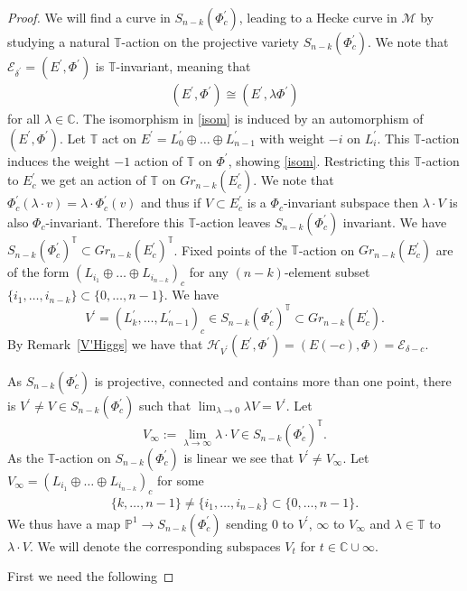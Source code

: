\documentclass[12pt]{article}
\numberwithin{equation}{section}
\theoremstyle{remark}
\theoremstyle{definition}
\numberwithin{theorem}{section}
\def\beq{\begin{eqnarray}}
\def\eeq{\end{eqnarray}}
\def\calE{{\mathcal E}}
\def\C{\mathbb{C}}
\def\M{{\mathcal{M}}}
\def\calH{\mathcal{H}}
\def\P{\mathbb{P}}
\newcommand{\T}{{\mathbb{T}}}
\def\d{{{\delta}}}
\renewcommand{\1}{\mathbbm{1}}
\begin{document}
\begin{proof}
	We will find a curve in $ S_{n-k}(\Phi^\prime_c)$, leading to a Hecke curve in $\M$ by studying a natural $\T$-action on the projective variety $S_{n-k}(\Phi^\prime_c)$. We note that $\calE_{\d^\prime}=(E^\prime, \Phi^\prime)$ is $\T$-invariant, meaning that \beq \label{isom}(E^\prime, \Phi^\prime)\cong (E^\prime, \lambda \Phi^\prime)\eeq for all $\lambda\in \C$. The isomorphism in \eqref{isom} is induced by an automorphism of $(E^\prime,\Phi^\prime)$. Let $\T$ act on $E^\prime=L^\prime_0\oplus \dots \oplus L^\prime_{n-1}$ with weight $-i$ on $L^\prime_i$. This $\T$-action induces the weight $-1$ action of $\T$ on $\Phi^\prime$, showing \eqref{isom}. Restricting this $\T$-action to $E^\prime_c$ we get an action of $\T$ on $Gr_{n-k}(E^\prime_c)$. We note that $\Phi^\prime_c(\lambda\cdot v)= \lambda\cdot \Phi^\prime_c(v)$ and thus if $V\subset E^\prime_c$ is a $\Phi_c$-invariant subspace then $\lambda\cdot V$ is also $\Phi_c$-invariant. Therefore this $\T$-action leaves $S_{n-k}(\Phi^\prime_c)$ invariant. We have $S_{n-k}(\Phi^\prime_c)^\T\subset Gr_{n-k}(E^\prime_c)^\T$.  Fixed points of the $\T$-action on $Gr_{n-k}(E^\prime_c)$ are of the form $(L_{i_1}\oplus \dots \oplus L_{i_{n-k}})_c$ for any $(n-k)$-element subset $\{i_1,\dots,i_{n-k} \}\subset \{0,\dots,n-1\}$. We  have $$V^\prime=(L^\prime_{k},\dots, L^\prime_{n-1})_c\in S_{n-k}(\Phi^\prime_c)^\T\subset Gr_{n-k}(E_c^\prime).$$ By Remark~\ref{V'Higgs} we have that $\calH_{V^\prime}(E^\prime,\Phi^\prime)=(E(-c),\Phi)=\calE_{\delta-c}$. 

 As $S_{n-k}(\Phi^\prime_c)$ is projective, connected and contains more than one point, there is $V^\prime\neq V\in S_{n-k}(\Phi^\prime_c)$ such that $\lim_{\lambda\to 0} \lambda V=V^\prime$. Let $$V_\infty:=\lim_{\lambda\to \infty} \lambda\cdot V\in S_{n-k}(\Phi^\prime_c)^\T.$$ As the $\T$-action on $S_{n-k}(\Phi^\prime_c)$ is linear we see that  $V^\prime\neq V_\infty$. Let $V_\infty=(L_{i_1}\oplus \dots \oplus L_{i_{n-k}})_c$ for some \beq\label{subset}\{k,\dots, n-1\}\neq \{i_1,\dots,i_{n-k} \}\subset \{0,\dots,n-1\}.\eeq We thus have a map  $\P^1\to S_{n-k}(\Phi^\prime_c)$ sending $0$ to $V^\prime$, $\infty$ to $V_\infty$ and $\lambda \in \T$ to $\lambda\cdot V$. We will denote the corresponding subspaces $V_t$ for $t\in \C \cup {\infty}$. 
	
	First we need the following 
	

\end{proof}
\end{document}
